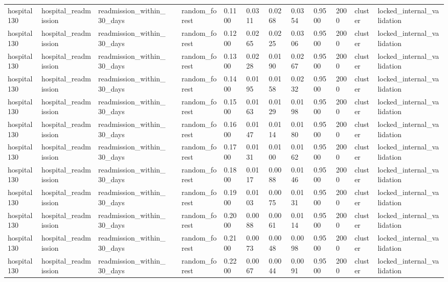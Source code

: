 \begin{tabular}{lllllllllllll}
hospital130 & hospital\_readmission & readmission\_within\_30\_days &  & random\_forest & 0.1100 & 0.0311 & 0.0268 & 0.0354 & 0.9500 & 2000 & cluster & locked\_internal\_validation \\
hospital130 & hospital\_readmission & readmission\_within\_30\_days &  & random\_forest & 0.1200 & 0.0265 & 0.0225 & 0.0306 & 0.9500 & 2000 & cluster & locked\_internal\_validation \\
hospital130 & hospital\_readmission & readmission\_within\_30\_days &  & random\_forest & 0.1300 & 0.0228 & 0.0190 & 0.0267 & 0.9500 & 2000 & cluster & locked\_internal\_validation \\
hospital130 & hospital\_readmission & readmission\_within\_30\_days &  & random\_forest & 0.1400 & 0.0195 & 0.0158 & 0.0232 & 0.9500 & 2000 & cluster & locked\_internal\_validation \\
hospital130 & hospital\_readmission & readmission\_within\_30\_days &  & random\_forest & 0.1500 & 0.0163 & 0.0129 & 0.0198 & 0.9500 & 2000 & cluster & locked\_internal\_validation \\
hospital130 & hospital\_readmission & readmission\_within\_30\_days &  & random\_forest & 0.1600 & 0.0147 & 0.0114 & 0.0180 & 0.9500 & 2000 & cluster & locked\_internal\_validation \\
hospital130 & hospital\_readmission & readmission\_within\_30\_days &  & random\_forest & 0.1700 & 0.0131 & 0.0100 & 0.0162 & 0.9500 & 2000 & cluster & locked\_internal\_validation \\
hospital130 & hospital\_readmission & readmission\_within\_30\_days &  & random\_forest & 0.1800 & 0.0117 & 0.0088 & 0.0146 & 0.9500 & 2000 & cluster & locked\_internal\_validation \\
hospital130 & hospital\_readmission & readmission\_within\_30\_days &  & random\_forest & 0.1900 & 0.0103 & 0.0075 & 0.0131 & 0.9500 & 2000 & cluster & locked\_internal\_validation \\
hospital130 & hospital\_readmission & readmission\_within\_30\_days &  & random\_forest & 0.2000 & 0.0088 & 0.0061 & 0.0114 & 0.9500 & 2000 & cluster & locked\_internal\_validation \\
hospital130 & hospital\_readmission & readmission\_within\_30\_days &  & random\_forest & 0.2100 & 0.0073 & 0.0048 & 0.0098 & 0.9500 & 2000 & cluster & locked\_internal\_validation \\
hospital130 & hospital\_readmission & readmission\_within\_30\_days &  & random\_forest & 0.2200 & 0.0067 & 0.0044 & 0.0091 & 0.9500 & 2000 & cluster & locked\_internal\_validation \\

\end{tabular}
